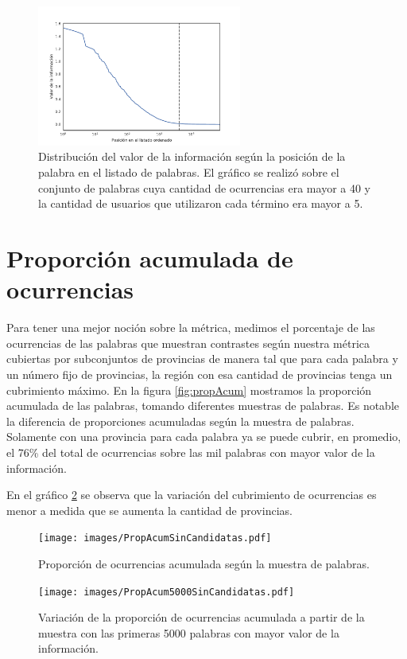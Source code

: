 \begin{figure}[ht]
\centering
\includegraphics[width=0.6\textwidth]{./images/train/conFiltro/valorInformacionCorte.pdf}
\caption{Distribución del valor de la información según la posición de la palabra en el listado de palabras. El gráfico se realizó sobre el conjunto de palabras cuya cantidad de ocurrencias era mayor a 40 y la cantidad de usuarios que utilizaron cada término era mayor a 5. } 
\label{fig:ivalue}
\end{figure}


\section{Proporción acumulada de ocurrencias} %
\label{proporcionDeOcurrencias}

Para tener una mejor noción sobre la métrica, medimos el porcentaje de las ocurrencias de las palabras que muestran contrastes según nuestra métrica cubiertas por subconjuntos de provincias de manera tal que para cada palabra y un número fijo de provincias, la región con esa cantidad de provincias tenga un cubrimiento máximo. 
En la figura \ref{fig:propAcum} mostramos la proporción acumulada de las palabras, tomando diferentes muestras de palabras. Es notable la diferencia de proporciones acumuladas según la muestra de palabras. Solamente con una provincia para cada palabra ya se puede cubrir, en promedio, el 76\% del total de ocurrencias sobre las mil palabras con mayor valor de la información.

En el gráfico \ref{fig:propAcum5000} se observa que la variación del cubrimiento de ocurrencias es menor a medida que se aumenta la cantidad de provincias. 



\begin{figure}[!ht]\centering
  \begin{minipage}{0.49\textwidth}
    \texttt{[image: images/PropAcumSinCandidatas.pdf]}
    \caption{Proporción de ocurrencias acumulada según la muestra de palabras.} 
    \label{fig:propAcum} 
   \end{minipage}
   \begin{minipage}{0.49\textwidth}
    \texttt{[image: images/PropAcum5000SinCandidatas.pdf]}
    \caption{Variación de la proporción de ocurrencias acumulada a partir de la muestra con las primeras 5000 palabras con mayor valor de la información.} 
    \label{fig:propAcum5000} 
   \end{minipage}
   
\end{figure}



